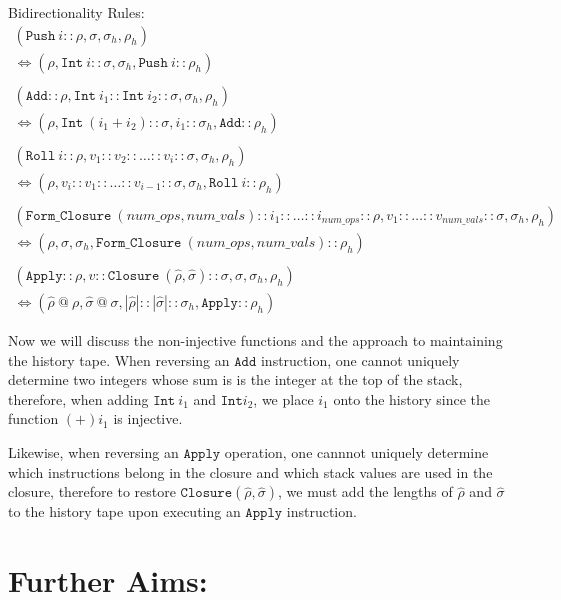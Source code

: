 \documentclass[11pt]{article}
\begin{document}
Bidirectionality Rules:
\begin{gather*}
    (\texttt{Push}\ i::\rho, \sigma, \sigma_h, \rho_h)\\
    \Longleftrightarrow (\rho, \texttt{Int}\ i::\sigma, \sigma_h, \texttt{Push}\ i::\rho_h) \\ \\
    (\texttt{Add}::\rho, \texttt{Int}\ i_1::\texttt{Int}\ i_2::\sigma, \sigma_h, \rho_h)\\
    \Longleftrightarrow (\rho, \texttt{Int}\ (i_1+i_2)::\sigma, i_1::\sigma_h, \texttt{Add}::\rho_h)\\ \\
    (\texttt{Roll}\ i::\rho, v_1::v_2::\dots::v_i::\sigma, \sigma_h, \rho_h)\\
    \Longleftrightarrow (\rho, v_i::v_1::\dots::v_{i-1}::\sigma, \sigma_h, \texttt{Roll}\ i::\rho_h)\\ \\
    (\texttt{Form\_Closure}\ (num\_ops, num\_vals)::i_1::\dots::i_{num\_ops}::\rho, v_1::\dots::v_{num\_vals}::\sigma, \sigma_h, \rho_h) \\
    \Longleftrightarrow (\rho, \sigma, \sigma_h, \texttt{Form\_Closure}\ (num\_ops, num\_vals)::\rho_h)\\ \\
    (\texttt{Apply}::\rho, v::\texttt{Closure}\ (\hat{\rho}, \hat{\sigma})::\sigma, \sigma, \sigma_h, \rho_h) \\
    \Longleftrightarrow (\hat{\rho}\ @\ \rho, \hat{\sigma}\ @\ \sigma, |\hat{\rho}|::|\hat{\sigma}|::\sigma_h, \texttt{Apply}::\rho_h)
\end{gather*}

Now we will discuss the non-injective functions and the approach to maintaining the history tape. When reversing an $\texttt{Add}$ instruction, one cannot uniquely determine two integers whose sum is is the integer at the top of the stack, therefore, when adding $\texttt{Int}\ i_1$ and $\texttt{Int} i_2$, we place $i_1$ onto the history since the function $(+) i_1$ is injective.

Likewise, when reversing an $\texttt{Apply}$ operation, one cannnot uniquely determine which instructions belong in the closure and which stack values are used in the closure, therefore to restore $\texttt{Closure} (\hat{\rho}, \hat{\sigma})$, we must add the lengths of $\hat{\rho}$ and $\hat{\sigma}$ to the history tape upon executing an $\texttt{Apply}$ instruction.

\section*{Further Aims:}
\end{document}

